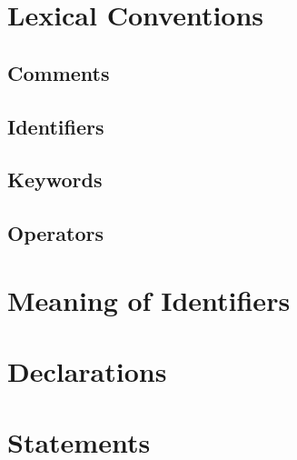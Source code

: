 \documentclass[12pt]{report}
\begin{document}
\tableofcontents

\chapter{Lexical Conventions}
\section{Comments}
\section{Identifiers}
\section{Keywords}
\section{Operators}

\chapter{Meaning of Identifiers}

\chapter{Declarations}

\chapter{Statements}
\end{document}

